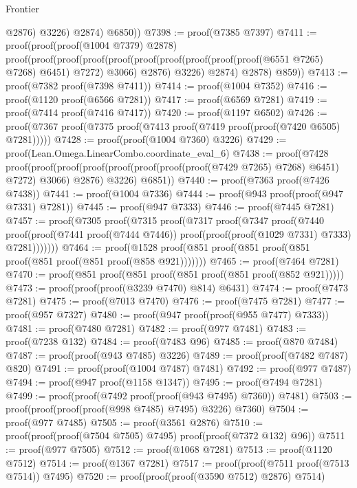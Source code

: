 \begin{lexlean}{Frontier}
\begin{coremodule}
                @2876)
              @3226)
            @2874)
          @6850))
@7398 := proof(@7385 @7397)
@7411 := proof(proof(proof(@1004 @7379) @2878)
      proof(proof(proof(proof(proof(proof(proof(proof(proof(proof(@6551 @7265) @7268) @6451) @7272)
                    @3066)
                  @2876)
                @3226)
              @2874)
            @2878)
          @859))
@7413 := proof(@7382 proof(@7398 @7411))
@7414 := proof(@1004 @7352)
@7416 := proof(@1120 proof(@6566 @7281))
@7417 := proof(@6569 @7281)
@7419 := proof(@7414 proof(@7416 @7417))
@7420 := proof(@1197 @6502)
@7426 := proof(@7367 proof(@7375 proof(@7413 proof(@7419 proof(proof(@7420 @6505) @7281)))))
@7428 := proof(proof(@1004 @7360) @3226)
@7429 := proof(Lean.Omega.LinearCombo.coordinate_eval_6)
@7438 := proof(@7428
      proof(proof(proof(proof(proof(proof(proof(proof(@7429 @7265) @7268) @6451) @7272) @3066)
              @2876)
            @3226)
          @6851))
@7440 := proof(@7363 proof(@7426 @7438))
@7441 := proof(@1004 @7336)
@7444 := proof(@943 proof(proof(@947 @7331) @7281))
@7445 := proof(@947 @7333)
@7446 := proof(@7445 @7281)
@7457 := proof(@7305
      proof(@7315
          proof(@7317
              proof(@7347
                  proof(@7440
                      proof(proof(@7441 proof(@7444 @7446))
                          proof(proof(proof(@1029 @7331) @7333) @7281)))))))
@7464 := proof(@1528 proof(@851 proof(@851 proof(@851 proof(@851 proof(@851 proof(@858 @921)))))))
@7465 := proof(@7464 @7281)
@7470 := proof(@851 proof(@851 proof(@851 proof(@851 proof(@852 @921)))))
@7473 := proof(proof(proof(@3239 @7470) @814) @6431)
@7474 := proof(@7473 @7281)
@7475 := proof(@7013 @7470)
@7476 := proof(@7475 @7281)
@7477 := proof(@957 @7327)
@7480 := proof(@947 proof(proof(@955 @7477) @7333))
@7481 := proof(@7480 @7281)
@7482 := proof(@977 @7481)
@7483 := proof(@7238 @132)
@7484 := proof(@7483 @96)
@7485 := proof(@870 @7484)
@7487 := proof(proof(@943 @7485) @3226)
@7489 := proof(proof(@7482 @7487) @820)
@7491 := proof(proof(@1004 @7487) @7481)
@7492 := proof(@977 @7487)
@7494 := proof(@947 proof(@1158 @1347))
@7495 := proof(@7494 @7281)
@7499 := proof(proof(@7492 proof(proof(@943 @7495) @7360)) @7481)
@7503 := proof(proof(proof(proof(@998 @7485) @7495) @3226) @7360)
@7504 := proof(@977 @7485)
@7505 := proof(@3561 @2876)
@7510 := proof(proof(proof(@7504 @7505) @7495) proof(proof(@7372 @132) @96))
@7511 := proof(@977 @7505)
@7512 := proof(@1068 @7281)
@7513 := proof(@1120 @7512)
@7514 := proof(@1367 @7281)
@7517 := proof(proof(@7511 proof(@7513 @7514)) @7495)
@7520 := proof(proof(proof(@3590 @7512) @2876) @7514)

\end{coremodule}
\end{lexlean}
